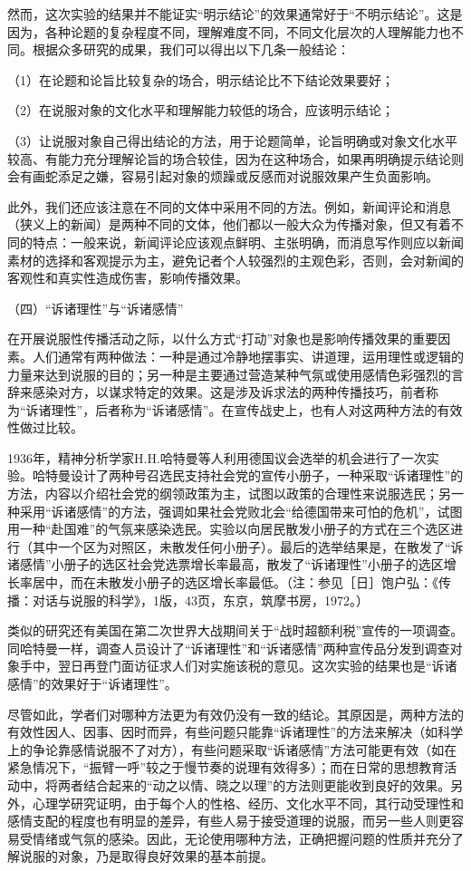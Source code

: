 \documentclass[UTF8,12pt]{ctexart}
\numberwithin{equation}{section} %
\numberwithin{figure}{section}
\numberwithin{table}{section}
\begin{document}
	然而，这次实验的结果并不能证实“明示结论”的效果通常好于“不明示结论”。这是因为，各种论题的复杂程度不同，理解难度不同，不同文化层次的人理解能力也不同。根据众多研究的成果，我们可以得出以下几条一般结论：
	
	（1）在论题和论旨比较复杂的场合，明示结论比不下结论效果要好；
	
	（2）在说服对象的文化水平和理解能力较低的场合，应该明示结论；
	
	（3）让说服对象自己得出结论的方法，用于论题简单，论旨明确或对象文化水平较高、有能力充分理解论旨的场合较佳，因为在这种场合，如果再明确提示结论则会有画蛇添足之嫌，容易引起对象的烦躁或反感而对说服效果产生负面影响。
	
	此外，我们还应该注意在不同的文体中采用不同的方法。例如，新闻评论和消息（狭义上的新闻）是两种不同的文体，他们都以一般大众为传播对象，但又有着不同的特点：一般来说，新闻评论应该观点鲜明、主张明确，而消息写作则应以新闻素材的选择和客观提示为主，避免记者个人较强烈的主观色彩，否则，会对新闻的客观性和真实性造成伤害，影响传播效果。
	
	（四）“诉诸理性”与“诉诸感情”
	
	在开展说服性传播活动之际，以什么方式“打动”对象也是影响传播效果的重要因素。人们通常有两种做法：一种是通过冷静地摆事实、讲道理，运用理性或逻辑的力量来达到说服的目的；另一种是主要通过营造某种气氛或使用感情色彩强烈的言辞来感染对方，以谋求特定的效果。这是涉及诉求法的两种传播技巧，前者称为“诉诸理性”，后者称为“诉诸感情”。在宣传战史上，也有人对这两种方法的有效性做过比较。
	
	1936年，精神分析学家H.H.哈特曼等人利用德国议会选举的机会进行了一次实验。哈特曼设计了两种号召选民支持社会党的宣传小册子，一种采取“诉诸理性”的方法，内容以介绍社会党的纲领政策为主，试图以政策的合理性来说服选民；另一种采用“诉诸感情”的方法，强调如果社会党败北会“给德国带来可怕的危机”，试图用一种“赴国难”的气氛来感染选民。实验以向居民散发小册子的方式在三个选区进行（其中一个区为对照区，未散发任何小册子）。最后的选举结果是，在散发了“诉诸感情”小册子的选区社会党选票增长率最高，散发了“诉诸理性”小册子的选区增长率居中，而在未散发小册子的选区增长率最低。（注：参见［日］饱户弘：《传播：对话与说服的科学》，1版，43页，东京，筑摩书房，1972。）
	
	类似的研究还有美国在第二次世界大战期间关于“战时超额利税”宣传的一项调查。同哈特曼一样，调查人员设计了“诉诸理性”和“诉诸感情”两种宣传品分发到调查对象手中，翌日再登门面访征求人们对实施该税的意见。这次实验的结果也是“诉诸感情”的效果好于“诉诸理性”。
	
	尽管如此，学者们对哪种方法更为有效仍没有一致的结论。其原因是，两种方法的有效性因人、因事、因时而异，有些问题只能靠“诉诸理性”的方法来解决（如科学上的争论靠感情说服不了对方），有些问题采取“诉诸感情”方法可能更有效（如在紧急情况下，“振臂一呼”较之于慢节奏的说理有效得多）；而在日常的思想教育活动中，将两者结合起来的“动之以情、晓之以理”的方法则更能收到良好的效果。另外，心理学研究证明，由于每个人的性格、经历、文化水平不同，其行动受理性和感情支配的程度也有明显的差异，有些人易于接受道理的说服，而另一些人则更容易受情绪或气氛的感染。因此，无论使用哪种方法，正确把握问题的性质并充分了解说服的对象，乃是取得良好效果的基本前提。
	
\end{document}
